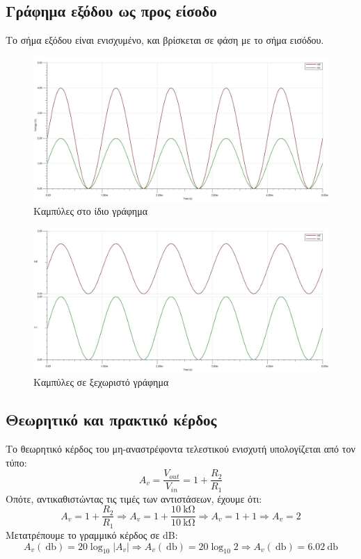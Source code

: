 \documentclass[12pt]{article}
\begin{document}
\subsection{Γράφημα εξόδου ως προς είσοδο}

Το σήμα εξόδου είναι ενισχυμένο, και βρίσκεται σε φάση με το σήμα εισόδου.

\begin{figure}[H]
	\centering
	\includegraphics[width=\linewidth]{./res/out1.jpg}
	\caption{Καμπύλες στο ίδιο γράφημα}
\end{figure}

\begin{figure}[H]
	\centering
	\includegraphics[width=\linewidth]{./res/out2.jpg}
	\caption{Καμπύλες σε ξεχωριστό γράφημα}
\end{figure}

\subsection{Θεωρητικό και πρακτικό κέρδος}

Το θεωρητικό κέρδος του μη-αναστρέφοντα τελεστικού ενισχυτή υπολογίζεται από
τον τύπο:
\[A_v = \frac{V_{out}}{V_{in}} = 1 + \frac{R_2}{R_1}\]
Οπότε, αντικαθιστώντας τις τιμές των αντιστάσεων, έχουμε ότι:
\[
	A_v = 1 + \frac{R_2}{R_1} \Rightarrow
	A_v = 1 + \frac{\SI{10}{\kilo\ohm}}{\SI{10}{\kilo\ohm}} \Rightarrow
	A_v = 1 + 1 \Rightarrow
	A_v = 2
\]
Μετατρέπουμε το γραμμικό κέρδος σε dB:
\[
	A_v(\SI{}{\decibel}) = 20\log_{10}\lvert A_v \lvert \Rightarrow
	A_v(\SI{}{\decibel}) = 20\log_{10} 2 \Rightarrow
	A_v(\SI{}{\decibel}) = \SI{6.02}{\decibel}
\]
\end{document}
